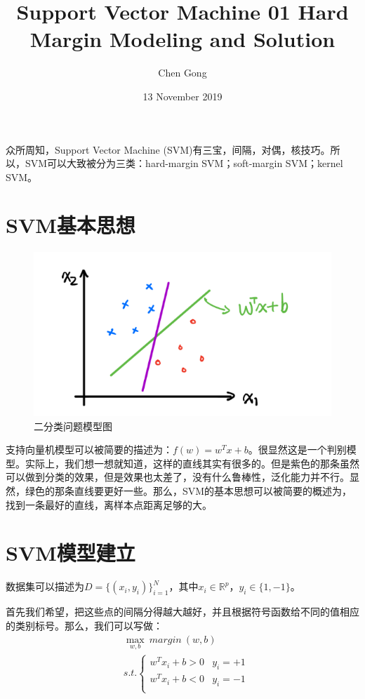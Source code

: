 \documentclass[a4paper]{article}
\title{Support Vector Machine 01 Hard Margin Modeling and Solution}
\author{Chen Gong}
\date{13 November 2019}
\begin{document}
\maketitle

众所周知，Support Vector Machine (SVM)有三宝，间隔，对偶，核技巧。所以，SVM可以大致被分为三类：hard-margin SVM；soft-margin SVM；kernel SVM。

\section{SVM基本思想}
\begin{figure}[H]
    \centering
    \includegraphics[width=.55\textwidth]{微信图片_20191113104442.png}
    \caption{二分类问题模型图}
\end{figure}

支持向量机模型可以被简要的描述为：$f(w) = w^Tx + b$。很显然这是一个判别模型。实际上，我们想一想就知道，这样的直线其实有很多的。但是紫色的那条虽然可以做到分类的效果，但是效果也太差了，没有什么鲁棒性，泛化能力并不行。显然，绿色的那条直线要更好一些。那么，SVM的基本思想可以被简要的概述为，找到一条最好的直线，离样本点距离足够的大。

\section{SVM模型建立}
数据集可以描述为$D=\{(x_i,y_i)\}^{N}_{i=1}$，其中$x_i\in\mathbb{R}^{p}$，$y_i\in\{1,-1\}$。

首先我们希望，把这些点的间隔分得越大越好，并且根据符号函数给不同的值相应的类别标号。那么，我们可以写做：
\begin{equation}
    \begin{split}
        & \max_{w,b} \ margin\ (w,b) \\
        & s.t. 
        \left\{
        \begin{array}{ll}
            w^Tx_i+b>0 & y_i = +1 \\
            w^Tx_i+b<0 & y_i = -1 \\
        \end{array}
        \right.
    \end{split}
\end{equation}
\end{document}

